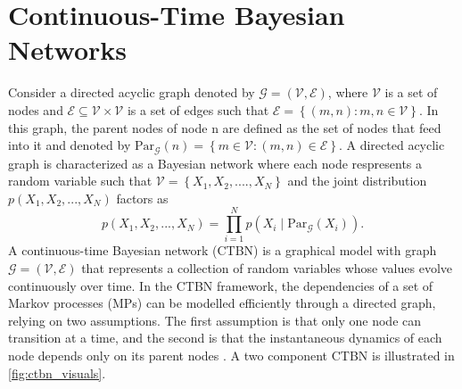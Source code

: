 \section{Continuous-Time Bayesian Networks}
\label{sec:ctbn_intro}
Consider a directed acyclic graph denoted by $ \mathcal{G} = \left( \mathcal{V}, \mathcal{E}\right) $, where $ \mathcal{V} $ is a set of nodes and $ \mathcal{E} \subseteq \mathcal{V} \times \mathcal{V} $ is a set of edges such that $ \mathcal{E} = \left\lbrace \left( m, n\right) : m, n \in \mathcal{V} \right\rbrace $. In this graph, the parent nodes of node n are defined as the set of nodes that feed into it and denoted by $ \mathrm{Par}_{\mathcal{G}}(n) = \left\lbrace m \in \mathcal{V} : \left( m, n \right) \in \mathcal{E} \right\rbrace $. A directed acyclic graph is characterized as a Bayesian network where each node respresents a random variable such that $ \mathcal{V} = \left\lbrace X_1, X_2, ...., X_N\right\rbrace  $ and the joint distribution $ p(X_1, X_2, ..., X_N) $ factors as 
\begin{equation}
p(X_1, X_2, ..., X_N) = \prod_{i=1}^{N} p(X_i \mid \mathrm{Par}_{\mathcal{G}}(X_i)).
\end{equation}
A continuous-time Bayesian network (CTBN) is a graphical model with graph $\mathcal{G} = \left( \mathcal{V}, \mathcal{E}\right) $ that represents a collection of random variables whose values evolve continuously over time. In the CTBN framework, the dependencies of a set of Markov processes (MPs) can be modelled efficiently through a directed graph, relying on two assumptions. The first assumption is that only one node can transition at a time, and the second is that the instantaneous dynamics of each node depends only on its parent nodes \cite{Cohn2010a, Nodelman1995}. A two component CTBN is illustrated in \autoref{fig:ctbn_visuals}.
